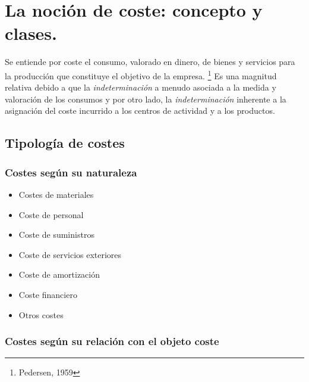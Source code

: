 \documentclass[12pt]{book} %
\providecommand{\tightlist}{%
  \setlength{\itemsep}{0pt}\setlength{\parskip}{0pt}}
\begin{document}
\hypertarget{la-nociuxf3n-de-coste-concepto-y-clases.}{%
\section{La noción de coste: concepto y
clases.}\label{la-nociuxf3n-de-coste-concepto-y-clases.}}

\begin{definicion}[Coste]
Se entiende por coste el consumo, valorado en dinero, de bienes y servicios para la producción que constituye el objetivo de la empresa. \footnote{Pedersen, 1959} Es una magnitud relativa debido a que la \textit{indeterminación} a menudo asociada a la medida y valoración de los consumos y por otro lado, la \textit{indeterminación} inherente a la asignación del coste incurrido a los centros de actividad y a los productos.
\end{definicion}

\hypertarget{tipologuxeda-de-costes}{%
\subsection{Tipología de costes}\label{tipologuxeda-de-costes}}

\hypertarget{costes-seguxfan-su-naturaleza}{%
\subsubsection{Costes según su
naturaleza}\label{costes-seguxfan-su-naturaleza}}

\begin{itemize}
\tightlist
\item
  Costes de materiales
\item
  Coste de personal
\item
  Coste de suministros
\item
  Coste de servicios exteriores
\item
  Coste de amortización
\item
  Coste financiero
\item
  Otros costes
\end{itemize}

\hypertarget{costes-seguxfan-su-relaciuxf3n-con-el-objeto-coste}{%
\subsubsection{Costes según su relación con el objeto
coste}\label{costes-seguxfan-su-relaciuxf3n-con-el-objeto-coste}}
\end{document}
